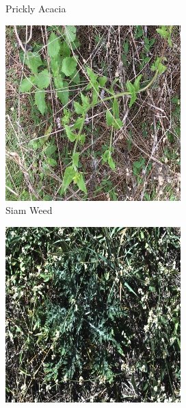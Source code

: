 \begin{figure}[h]
\begin{subfigure}{0.24\textwidth}
        \caption{Prickly Acacia}
    \end{subfigure}
    \hfill
    \begin{subfigure}{0.24\textwidth}
        \includegraphics[width=\textwidth]{figuras/problema/siam_weed.jpg}
        \caption{Siam Weed}
    \end{subfigure}
    \hfill
    \begin{subfigure}{0.24\textwidth}
        \includegraphics[width=\textwidth]{figuras/problema/parthenium.jpg}

\end{subfigure}
\end{figure}
